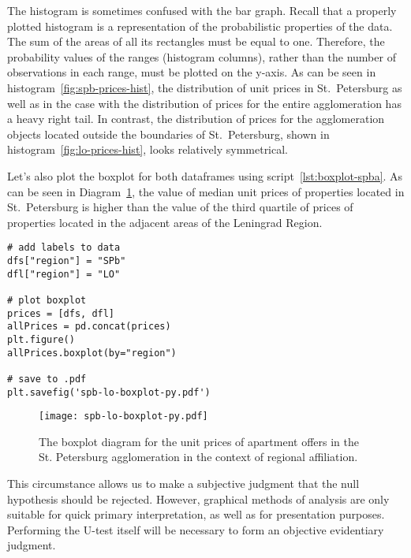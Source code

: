 \documentclass[]{scrreprt}
\begin{document}
The histogram is sometimes confused with the bar graph. Recall that a properly plotted histogram is a representation of the probabilistic properties of the data. The sum of the areas of all its rectangles must be equal to one. Therefore, the probability values of the ranges (histogram columns), rather than the number of observations in each range, must be plotted on the y-axis. As can be seen in histogram~\ref{fig:spb-prices-hist}, the distribution of unit prices in St.~Petersburg as well as in the case with the distribution of prices for the entire agglomeration has a heavy right tail. In contrast, the distribution of prices for the agglomeration objects located outside the boundaries of St.~Petersburg, shown in histogram~\ref{fig:lo-prices-hist}, looks relatively symmetrical.

Let's also plot the boxplot for both dataframes using script~\ref{lst:boxplot-spba}. As can be seen in Diagram~\ref{fig:spb-lo-boxplot-py}, the value of median unit prices of properties located in St.~Petersburg is higher than the value of the third quartile of prices of properties located in the adjacent areas of the Leningrad Region.
%
\begin{lstlisting}[float=htp, caption = Plotting the boxplot for both subsamples, firstnumber=1, label= lst:boxplot-spba]
# add labels to data
dfs["region"] = "SPb"
dfl["region"] = "LO"

# plot boxplot
prices = [dfs, dfl]
allPrices = pd.concat(prices)
plt.figure()
allPrices.boxplot(by="region")

# save to .pdf
plt.savefig('spb-lo-boxplot-py.pdf')
\end{lstlisting} 
%
\begin{figure}[htp]
	\centering
	\texttt{[image: spb-lo-boxplot-py.pdf]}
	\caption{The boxplot diagram for the unit prices of apartment offers in the St. Petersburg agglomeration in the context of regional affiliation.}
	\label{fig:spb-lo-boxplot-py}
\end{figure}

This circumstance allows us to make a subjective judgment that the null hypothesis should be rejected. However, graphical methods of analysis are only suitable for quick primary interpretation, as well as for presentation purposes. Performing the U-test itself will be necessary to form an objective evidentiary judgment.
\end{document}
